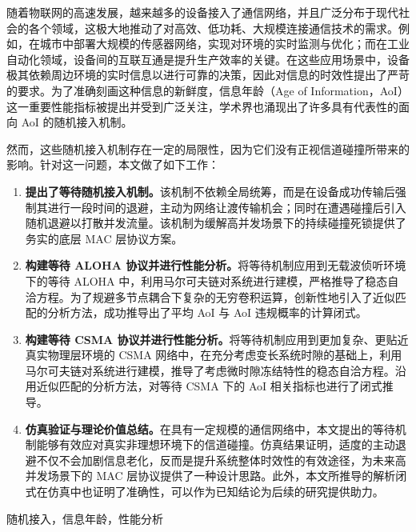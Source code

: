 \begin{abstractCN}
\setlength{\baselineskip}{23pt} %

随着物联网的高速发展，越来越多的设备接入了通信网络，并且广泛分布于现代社会的各个领域，这极大地推动了对高效、低功耗、大规模连接通信技术的需求。例如，在城市中部署大规模的传感器网络，实现对环境的实时监测与优化；而在工业自动化领域，设备间的互联互通是提升生产效率的关键。在这些应用场景中，设备极其依赖周边环境的实时信息以进行可靠的决策，因此对信息的时效性提出了严苛的要求。为了准确刻画这种信息的新鲜度，信息年龄（Age of Information，AoI）这一重要性能指标被提出并受到广泛关注，学术界也涌现出了许多具有代表性的面向 AoI 的随机接入机制。

然而，这些随机接入机制存在一定的局限性，因为它们没有正视信道碰撞所带来的影响。针对这一问题，本文做了如下工作：

\begin{enumerate} [wide]
    \item \textbf{提出了等待随机接入机制。}该机制不依赖全局统筹，而是在设备成功传输后强制其进行一段时间的退避，主动为网络让渡传输机会；同时在遭遇碰撞后引入随机退避以打散并发流量。该机制为缓解高并发场景下的持续碰撞死锁提供了务实的底层 MAC 层协议方案。
    \item \textbf{构建等待 ALOHA 协议并进行性能分析。}将等待机制应用到无载波侦听环境下的等待 ALOHA 中，利用马尔可夫链对系统进行建模，严格推导了稳态自洽方程。为了规避多节点耦合下复杂的无穷卷积运算，创新性地引入了近似匹配的分析方法，成功推导出了平均 AoI 与 AoI 违规概率的计算闭式。
    \item \textbf{构建等待 CSMA 协议并进行性能分析。}将等待机制应用到更加复杂、更贴近真实物理层环境的 CSMA 网络中，在充分考虑变长系统时隙的基础上，利用马尔可夫链对系统进行建模，推导了考虑微时隙冻结特性的稳态自洽方程。沿用近似匹配的分析方法，对等待 CSMA 下的 AoI 相关指标也进行了闭式推导。
    \item \textbf{仿真验证与理论价值总结。}在具有一定规模的通信网络中，本文提出的等待机制能够有效应对真实非理想环境下的信道碰撞。仿真结果证明，适度的主动退避不仅不会加剧信息老化，反而是提升系统整体时效性的有效途径，为未来高并发场景下的 MAC 层协议提供了一种设计思路。此外，本文所推导的解析闭式在仿真中也证明了准确性，可以作为已知结论为后续的研究提供助力。
\end{enumerate}


\end{abstractCN}


\begin{keywordCN}
随机接入，信息年龄，性能分析
\end{keywordCN}

